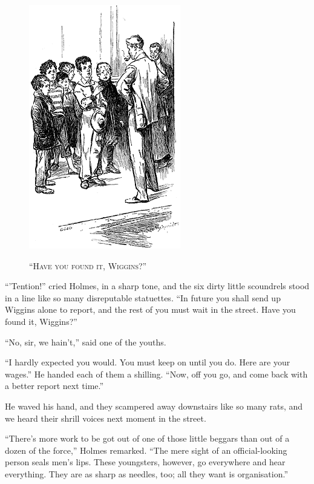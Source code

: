 \documentclass[12pt,english,oneside]{book}
\newcommand{\noun}[1]{\textsc{#1}}
\begin{document}
%
\begin{figure}[htbp]
\noindent \begin{center}\includegraphics{images/study10-stud-10.png}\end{center}

\noindent \begin{center}\noun{{}``Have you found it, Wiggins?''}\end{center}
\end{figure}
{}``'Tention!'' cried Holmes, in a sharp tone, and the six dirty
little scoundrels stood in a line like so many disreputable statuettes.
{}``In future you shall send up Wiggins alone to report, and the
rest of you must wait in the street. Have you found it, Wiggins?''

{}``No, sir, we hain't,'' said one of the youths.

{}``I hardly expected you would. You must keep on until you do. Here
are your wages.'' He handed each of them a shilling. {}``Now, off
you go, and come back with a better report next time.''

He waved his hand, and they scampered away downstairs like so many
rats, and we heard their shrill voices next moment in the street.

{}``There's more work to be got out of one of those little beggars
than out of a dozen of the force,'' Holmes remarked. {}``The mere
sight of an official-looking person seals men's lips. These youngsters,
however, go everywhere and hear everything. They are as sharp as needles,
too; all they want is organisation.''
\end{document}
